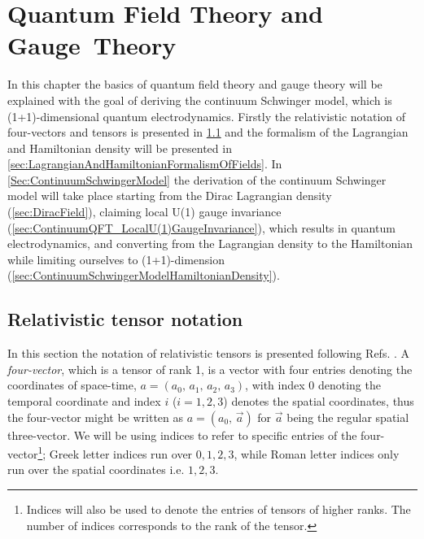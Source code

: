 \documentclass[../main.tex]{subfiles} %
\begin{document}
\chapter{Quantum Field Theory and Gauge~Theory} \label{chap:ContinuumQFT}


In this chapter the basics of quantum field theory and gauge theory will be explained with the goal of deriving the continuum Schwinger model, which is (1+1)-dimensional quantum electrodynamics. Firstly the relativistic notation of four-vectors and tensors is presented in \cref{sec:RelativisticTensorNotation} and the formalism of the Lagrangian and Hamiltonian density will be presented in \cref{sec:LagrangianAndHamiltonianFormalismOfFields}. In \cref{Sec:ContinuumSchwingerModel} the derivation of the continuum Schwinger model will take place starting from the Dirac Lagrangian density (\cref{sec:DiracField}), claiming local U(1) gauge invariance (\cref{sec:ContinuumQFT_LocalU(1)GaugeInvariance}), which results in quantum electrodynamics, and converting from the Lagrangian density to the Hamiltonian while limiting ourselves to (1+1)-dimension (\cref{sec:ContinuumSchwingerModelHamiltonianDensity}).




\section{Relativistic tensor notation} \label{sec:RelativisticTensorNotation}

In this section the notation of relativistic tensors is presented following Refs. \cite{peskin_introToQFT_1995,Uggerhoej_SpecielRelativitetsteori_2016}. A \emph{four-vector}, which is a tensor of rank 1, is a vector with four entries denoting the coordinates of space-time, $a = (a_0,\, a_1,\, a_2,\, a_3)$, with index $0$ denoting the temporal coordinate and index $i$ ($i = 1,2,3$) denotes the spatial coordinates, thus the four-vector might be written as $a = (a_0,\, \Vec{a})$ for $\Vec{a}$ being the regular spatial three-vector. We will be using indices to refer to specific entries of the four-vector\footnote{Indices will also be used to denote the entries of tensors of higher ranks. The number of indices corresponds to the rank of the tensor.}; Greek letter indices run over $0,1,2,3$, while Roman letter indices only run over the spatial coordinates i.e. $1,2,3$.
\end{document}
